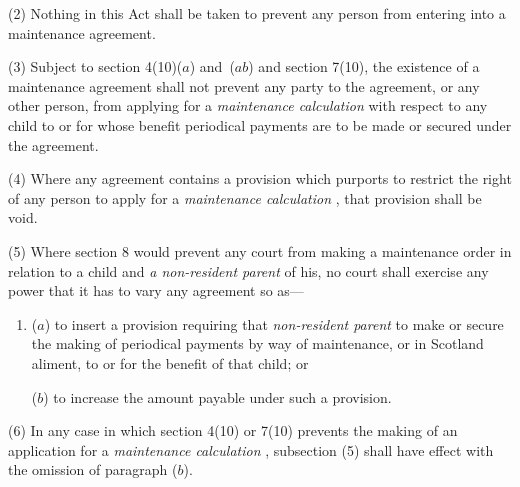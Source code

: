 \documentclass[12pt,a4paper]{article}
\begin{document}
(2) Nothing in this Act shall be taken to prevent any person from entering into a maintenance agreement.

(3) 
Subject to section 4(10)($a$) 
and~($ab$)  %
and section 7(10),  %
the existence of a maintenance agreement shall not prevent any party to the agreement, or any other person, from applying for a 
\emph{maintenance calculation}  %
with respect to any child to or for whose benefit periodical payments are to be made or secured under the agreement.

(4) Where any agreement contains a provision which purports to restrict the right of any person to apply for a 
\emph{maintenance calculation}%
, that provision shall be void.

(5) Where section 8 would prevent any court from making a maintenance order in relation to a child and 
\emph{a non-resident parent}  %
of his, no court shall exercise any power that it has to vary any agreement so as—
\begin{enumerate}\item[]
($a$) to insert a provision requiring that 
\emph{non-resident parent}  %
to make or secure the making of periodical payments by way of maintenance, or in Scotland aliment, to or for the benefit of that child; or

($b$) to increase the amount payable under such a provision.
\end{enumerate}

(6) In any case in which section 4(10) or 7(10) prevents the making of an application for a 
\emph{maintenance calculation}%
, 
%
%
%
subsection (5) shall have effect with the omission of paragraph ($b$).
\end{document}
